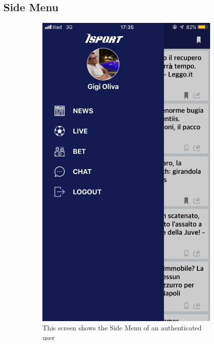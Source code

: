 \documentclass[numbers=noenddot, 12pt, a4paper, oneside]{scrbook}
\begin{document}
\subsection*{Side Menu}
\begin{figure}[H]
	\begin{subfigure}{.5\textwidth}
		\centering
		\includegraphics[width=.8\linewidth]{images/Screen/SideMenu}
		\caption{This screen shows the Side Menu of an authenticated user}
	\end{subfigure}
	\begin{subfigure}{.5\textwidth}
		\centering

\end{subfigure}
\end{figure}
\end{document}
